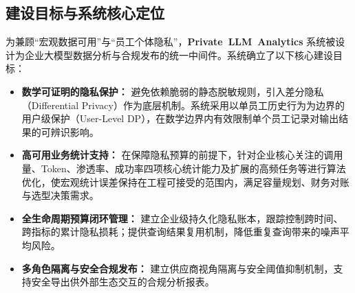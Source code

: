 \subsection{建设目标与系统核心定位}
为兼顾“宏观数据可用”与“员工个体隐私”，\textbf{\mbox{Private LLM Analytics}} 系统被设计为企业大模型数据分析与合规发布的统一中间件。系统确立了以下核心建设目标：
\begin{itemize}[leftmargin=2em]
  \item \textbf{数学可证明的隐私保护：} 避免依赖脆弱的静态脱敏规则，引入差分隐私（Differential Privacy）作为底层机制。系统采用以单员工历史行为为边界的用户级保护（User-Level DP），在数学边界内有效限制单个员工记录对输出结果的可辨识影响。
  \item \textbf{高可用业务统计支持：} 在保障隐私预算的前提下，针对企业核心关注的调用量、Token、渗透率、成功率四项核心统计能力及扩展的高频任务等进行算法优化，使宏观统计误差保持在工程可接受的范围内，满足容量规划、财务对账与选型决策需求。
  \item \textbf{全生命周期预算闭环管理：} 建立企业级持久化隐私账本，跟踪控制跨时间、跨指标的累计隐私损耗；提供查询结果复用机制，降低重复查询带来的噪声平均风险。
  \item \textbf{多角色隔离与安全合规发布：} 建立供应商视角隔离与安全阈值抑制机制，支持安全导出供外部生态交互的合规分析报表。
\end{itemize}
